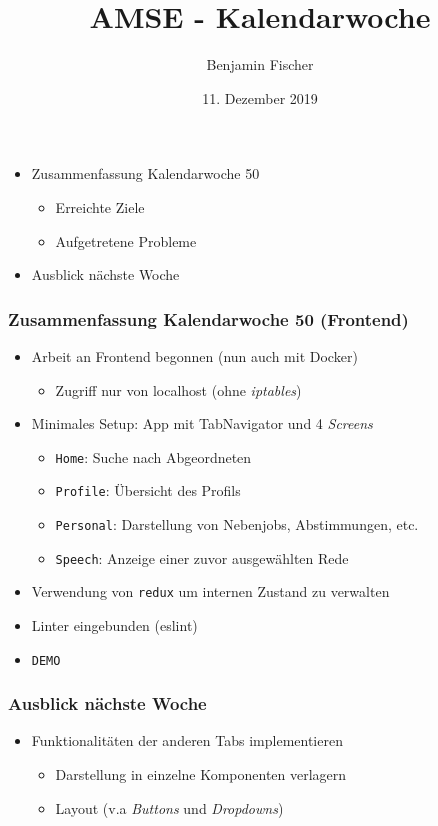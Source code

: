 \documentclass{beamer}
\title{AMSE - Kalendarwoche \cw{}}
\date{11. Dezember 2019}
\author{Benjamin Fischer}
\institute{benjamin.f.fischer@fau.de}
\newcommand{\cw}{50}
\begin{document}
  \maketitle

  \begin{frame}
    \begin{itemize}
      \item Zusammenfassung Kalendarwoche \cw{}
      \begin{itemize}
        \item Erreichte Ziele
        \item Aufgetretene Probleme
      \end{itemize}
      \item Ausblick nächste Woche
    \end{itemize}
  \end{frame}


  \begin{frame}
    \frametitle{Zusammenfassung Kalendarwoche \cw{} (Frontend)}
    \begin{itemize}
      \item Arbeit an Frontend begonnen (nun auch mit Docker)
      \begin{itemize}
        \item Zugriff nur von localhost (ohne \textit{iptables})
      \end{itemize}
      \item Minimales Setup: App mit TabNavigator und 4 \textit{Screens}
      \begin{itemize}
        \item \texttt{Home}: Suche nach Abgeordneten
        \item \texttt{Profile}: Übersicht des Profils
        \item \texttt{Personal}: Darstellung von Nebenjobs, Abstimmungen, etc.
        \item \texttt{Speech}: Anzeige einer zuvor ausgewählten Rede
      \end{itemize}
      \item Verwendung von \texttt{redux} um internen Zustand zu verwalten
      \item Linter eingebunden (eslint)
      \item \texttt{DEMO}
    \end{itemize}
  \end{frame}

  \begin{frame}
    \frametitle{Ausblick nächste Woche}
    \begin{itemize}
      \item Funktionalitäten der anderen Tabs implementieren
      \begin{itemize}
        \item Darstellung in einzelne Komponenten verlagern
        \item Layout (v.a \textit{Buttons} und \textit{Dropdowns})
      \end{itemize}
    \end{itemize}
  \end{frame}
\end{document}
